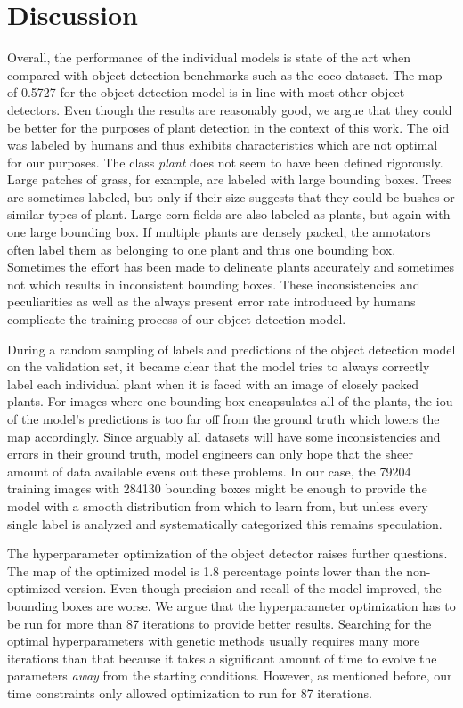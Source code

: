 \documentclass[draft,final]{vutinfth} %
\begin{document}
\section{Discussion}
\label{sec:discussion}

Overall, the performance of the individual models is state of the art
when compared with object detection benchmarks such as the \gls{coco}
dataset. The \gls{map} of \num{0.5727} for the object detection model
is in line with most other object detectors. Even though the results
are reasonably good, we argue that they could be better for the
purposes of plant detection in the context of this work. The \gls{oid}
was labeled by humans and thus exhibits characteristics which are not
optimal for our purposes. The class \emph{plant} does not seem to have
been defined rigorously. Large patches of grass, for example, are
labeled with large bounding boxes. Trees are sometimes labeled, but
only if their size suggests that they could be bushes or similar types
of plant. Large corn fields are also labeled as plants, but again with
one large bounding box. If multiple plants are densely packed, the
annotators often label them as belonging to one plant and thus one
bounding box. Sometimes the effort has been made to delineate plants
accurately and sometimes not which results in inconsistent bounding
boxes. These inconsistencies and peculiarities as well as the always
present error rate introduced by humans complicate the training
process of our object detection model.

During a random sampling of labels and predictions of the object
detection model on the validation set, it became clear that the model
tries to always correctly label each individual plant when it is faced
with an image of closely packed plants. For images where one bounding
box encapsulates all of the plants, the \gls{iou} of the model's
predictions is too far off from the ground truth which lowers the
\gls{map} accordingly. Since arguably all datasets will have some
inconsistencies and errors in their ground truth, model engineers can
only hope that the sheer amount of data available evens out these
problems. In our case, the \num{79204} training images with
\num{284130} bounding boxes might be enough to provide the model with
a smooth distribution from which to learn from, but unless every
single label is analyzed and systematically categorized this remains
speculation.

The hyperparameter optimization of the object detector raises further
questions. The \gls{map} of the optimized model is \num{1.8}
percentage points lower than the non-optimized version. Even though
precision and recall of the model improved, the bounding boxes are
worse. We argue that the hyperparameter optimization has to be run for
more than \num{87} iterations to provide better results. Searching for
the optimal hyperparameters with genetic methods usually requires many
more iterations than that because it takes a significant amount of
time to evolve the parameters \emph{away} from the starting
conditions. However, as mentioned before, our time constraints only
allowed optimization to run for \num{87} iterations.
\end{document}
